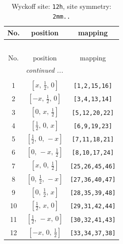 \documentclass[fleqn,8pt]{jsarticle}
\begin{document}
\begin{longtable}{ccc}
\caption{Wyckoff site: {\tt 12h}, site symmetry: {\tt 2mm..}}
 \\
 \hline \hline
No. & position & mapping \\ \hline \endfirsthead

\multicolumn{2}{l}{\tablename\ \thetable{}} \\
 \hline \hline
No. & position & mapping \\ \hline \endhead

 \hline \hline
\multicolumn{2}{r}{\footnotesize\it continued ...} \\ \endfoot

 \hline \hline
\multicolumn{2}{r}{} \\ \endlastfoot

1 & $\left[ x,\, \frac{1}{2},\, 0 \right]$ & {\tt [1,2,15,16]} \\ \hline
2 & $\left[ - x,\, \frac{1}{2},\, 0 \right]$ & {\tt [3,4,13,14]} \\ \hline
3 & $\left[ 0,\, x,\, \frac{1}{2} \right]$ & {\tt [5,12,20,22]} \\ \hline
4 & $\left[ \frac{1}{2},\, 0,\, x \right]$ & {\tt [6,9,19,23]} \\ \hline
5 & $\left[ \frac{1}{2},\, 0,\, - x \right]$ & {\tt [7,11,18,21]} \\ \hline
6 & $\left[ 0,\, - x,\, \frac{1}{2} \right]$ & {\tt [8,10,17,24]} \\ \hline
7 & $\left[ x,\, 0,\, \frac{1}{2} \right]$ & {\tt [25,26,45,46]} \\ \hline
8 & $\left[ 0,\, \frac{1}{2},\, - x \right]$ & {\tt [27,36,40,47]} \\ \hline
9 & $\left[ 0,\, \frac{1}{2},\, x \right]$ & {\tt [28,35,39,48]} \\ \hline
10 & $\left[ \frac{1}{2},\, x,\, 0 \right]$ & {\tt [29,31,42,44]} \\ \hline
11 & $\left[ \frac{1}{2},\, - x,\, 0 \right]$ & {\tt [30,32,41,43]} \\ \hline
12 & $\left[ - x,\, 0,\, \frac{1}{2} \right]$ & {\tt [33,34,37,38]} \\
\end{longtable}
\renewcommand{\arraystretch}{1.2}
\end{document}
